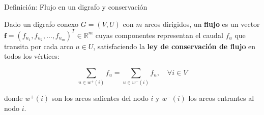 \documentclass[
  ignorenonframetext,
]{beamer}
\begin{document}
\begin{frame}{Definición: Flujo en un digrafo y conservación}
\label{definiciuxf3n-flujo-en-un-digrafo-y-conservaciuxf3n}
\begin{tcolorbox}[enhanced jigsaw, opacityback=0, breakable, title=\textcolor{quarto-callout-note-color}{\faInfo}\hspace{0.5em}{Flujo en un digrafo y conservación}, colback=white, colbacktitle=quarto-callout-note-color!10!white, bottomrule=.15mm, opacitybacktitle=0.6, coltitle=black, bottomtitle=1mm, leftrule=.75mm, colframe=quarto-callout-note-color-frame, toptitle=1mm, titlerule=0mm, rightrule=.15mm, left=2mm, arc=.35mm, toprule=.15mm]

Dado un digrafo conexo \(G = (V, U)\) con \(m\) arcos dirigidos, un
\textbf{flujo} es un vector
\(\mathbf{f} = (f_{u_1}, f_{u_2}, \dots, f_{u_m})^T \in \mathbb{R}^m\)
cuyas componentes representan el caudal \(f_u\) que transita por cada
arco \(u \in U\), satisfaciendo la \textbf{ley de conservación de flujo}
en todos los vértices:

\[
\sum_{u \in w^+(i)} f_u = \sum_{u \in w^-(i)} f_u, \quad \forall i \in V
\]

donde \(w^+(i)\) son los arcos salientes del nodo \(i\) y \(w^-(i)\) los
arcos entrantes al nodo \(i\).

\end{tcolorbox}
\end{frame}
\end{document}
